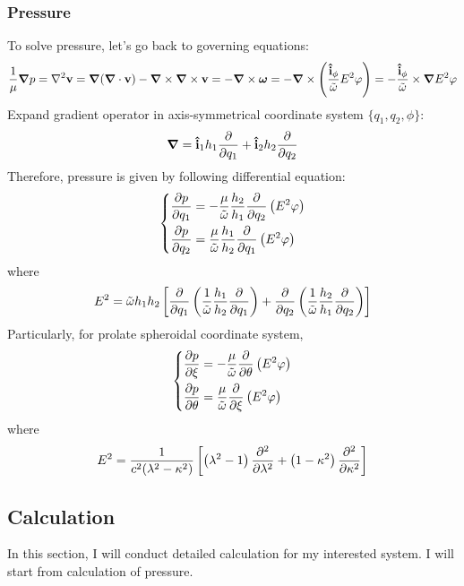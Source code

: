 \documentclass[fontsize=11pt, %
                             paper=a4, %
                             twoside, %
                             captions=tableheading,
                             index=totoc,
                             hyperref]{labbook}
\begin{document}
\subsubsection{Pressure}
To solve pressure, let's go back to governing equations:
\begin{equation}
\frac{1}{\mu}\mbox{\boldmath$ \nabla $} p=\nabla^2\mathbf{v}=\mbox{\boldmath$ \nabla $} (\mbox{\boldmath$ \nabla $} \cdot \mathbf{v})-\mbox{\boldmath$ \nabla $} \times \mbox{\boldmath$ \nabla $} \times \mathbf{v}=-\mbox{\boldmath$ \nabla $} \times \mbox{\boldmath$ \omega $}=-\mbox{\boldmath$ \nabla $} \times \left(\frac{\mathbf{\hat{i}}_\phi}{\tilde\omega}E^2\varphi\right)=-\frac{\mathbf{\hat{i}}_\phi}{\tilde\omega}\times \mbox{\boldmath$ \nabla $} E^2\varphi
\end{equation}
Expand gradient operator in axis-symmetrical coordinate system $\{q_1,q_2,\phi\}$:
\begin{equation}
\mbox{\boldmath$ \nabla $} = \mathbf{\hat{i}}_1 h_1\frac{\partial }{\partial q_1}+\mathbf{\hat{i}}_2 h_2\frac{\partial }{\partial q_2}
\end{equation}
Therefore, pressure is given by following differential equation:
\begin{equation}
\left\{
\begin{aligned}
\frac{\partial p}{\partial q_1}&=-\frac{\mu}{\tilde\omega}\frac{h_2}{h_1}\frac{\partial }{\partial q_2}\left(E^2 \varphi\right)\\
\frac{\partial p}{\partial q_2}&=\frac{\mu}{\tilde\omega}\frac{h_1}{h_2}\frac{\partial }{\partial q_1}\left(E^2 \varphi\right)
\end{aligned}
\right.
\end{equation}
where
\begin{equation}
E^2=\tilde{\omega}h_1h_2\left[\frac{\partial }{\partial q_1}\left(\frac{1}{\tilde{\omega}}\frac{h_1}{h_2}\frac{\partial }{\partial q_1}\right)+\frac{\partial }{\partial q_2}\left(\frac{1}{\tilde{\omega}}\frac{h_2}{h_1}\frac{\partial }{\partial q_2}\right)\right]
\end{equation}
Particularly, for prolate spheroidal coordinate system,
\begin{equation}\label{eqn-pressure}
\left\{
\begin{aligned}
\frac{\partial p}{\partial \xi}&=-\frac{\mu}{\tilde\omega}\frac{\partial }{\partial \theta}\left(E^2 \varphi\right)\\
\frac{\partial p}{\partial \theta}&=\frac{\mu}{\tilde\omega}\frac{\partial }{\partial \xi}\left(E^2 \varphi\right)
\end{aligned}
\right.
\end{equation}
where
\begin{equation}
E^2=\frac{1}{c^2(\lambda^2-\kappa^2)}\left[\left(\lambda^2-1\right)\frac{\partial^2 }{\partial \lambda^2}+\left(1-\kappa^2\right)\frac{\partial^2 }{\partial \kappa^2}\right]
\end{equation}
\subsection{Calculation}
In this section, I will conduct detailed calculation for my interested system. I will start from calculation of pressure.
\end{document}
